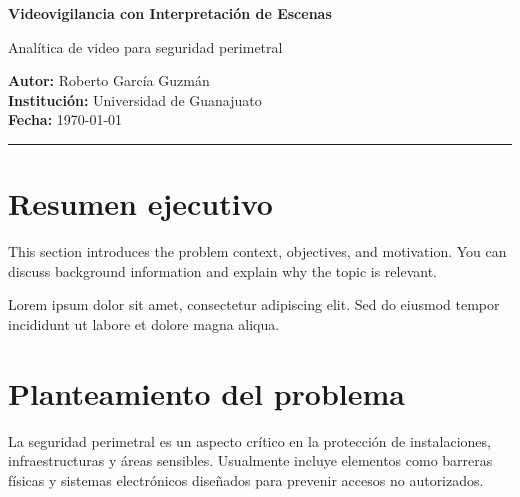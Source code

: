 \documentclass[11pt,a4paper]{article}
\begin{document}

\begin{center}

    \vspace{1cm}

    {\Huge\bfseries\color{primary}
        Videovigilancia con Interpretación de Escenas\par}

    \vspace{0.5cm}

    {\Large Analítica de video para seguridad perimetral\par}

    \vspace{0.5cm}

    \large
    \textbf{Autor:} Roberto García Guzmán\\
    \textbf{Institución:} Universidad de Guanajuato\\
    \textbf{Fecha:} \today

    \vspace{0.5cm}

    \rule{0.8\textwidth}{0.5pt}

    \vspace{0.5cm}

\end{center}

\tableofcontents
\newpage

\section{Resumen ejecutivo}


This section introduces the problem context, objectives, and motivation.
You can discuss background information and explain why the topic is relevant.

Lorem ipsum dolor sit amet, consectetur adipiscing elit. Sed do eiusmod tempor
incididunt ut labore et dolore magna aliqua.

\section{Planteamiento del problema}

La seguridad perimetral es un aspecto crítico en la protección de instalaciones, infraestructuras y áreas sensibles. Usualmente incluye elementos como barreras físicas y sistemas electrónicos diseñados para prevenir accesos no autorizados.
\end{document}
